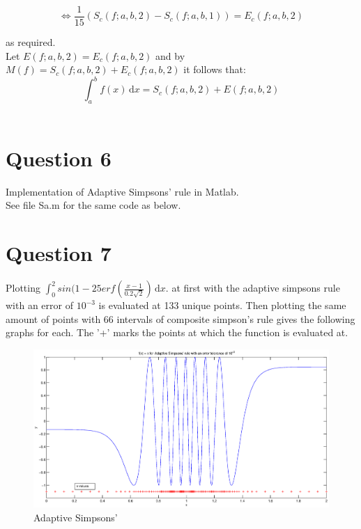 \documentclass[fleqn]{report}
\begin{document}
\begin{equation*}
\iff \frac{1}{15}(S_c(f;a,b,2) - S_c(f;a,b,1)) = E_c(f;a,b,2)
\end{equation*}

as required.\\

\noindent Let $E(f;a,b,2) = E_c(f;a,b,2)$ and by $M(f) = S_c(f;a,b,2) + E_c(f;a,b,2)$ 
it follows that:\\

\begin{equation*}
\int_a^b \! f(x) \, \mathrm{d}x  = S_c(f;a,b,2) + E(f;a,b,2)
\end{equation*}
\\


\pagebreak

\section{Question 6}
Implementation of Adaptive Simpsons' rule in Matlab. \\

See file Sa.m for the same code as below.



\pagebreak

\section{Question 7}

Plotting $ \int_0^2 \! sin(1 - 25erf(\frac{x-1}{0.2\sqrt{2}}) \,\mathrm{d}x.$ 
at first with the adaptive simpsons rule with an error of $10^{-3}$ is evaluated at 
133 unique points. Then plotting the same amount of points with 66 intervals of composite 
simpson's rule gives the following graphs for each. The '+' marks the points at which
the function is evaluated at.

\begin{figure}[h!]
\begin{center}
    \centerline{\includegraphics[width=1.8\textwidth]{q7adaptive.eps}}
    \caption{Adaptive Simpsons'}
\end{center}
\end{figure}
\end{document}
